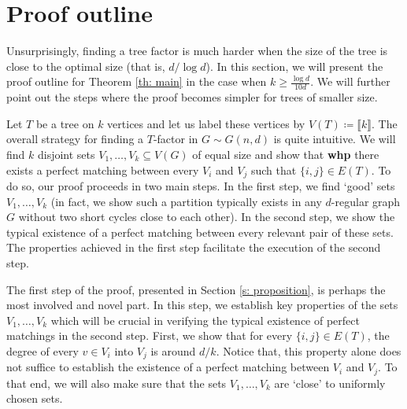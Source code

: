 \documentclass[notitlepage]{scrartcl}
\newcommand{\br}[1]{\llbracket{#1}\rrbracket}
\begin{document}
 
\section{Proof outline}\label{s: outline}
Unsurprisingly, finding a tree factor is much harder when the size of the tree is close to the optimal size (that is, $d/\log d$). In this section, we will present the proof outline for Theorem \ref{th: main} in the case when $k\geq\frac{\log d}{10d}$. We will further point out the steps where the proof becomes simpler for trees of smaller size.

Let $T$ be a tree on $k$ vertices and let us label these vertices by $V(T) \coloneqq \br{k}$. The overall strategy for finding a $T$-factor in $G \sim G(n, d)$ is quite intuitive. We will find $k$ disjoint sets $V_1, \dots, V_k \subseteq V(G)$ of equal size and show that \textbf{whp} there exists a perfect matching between every $V_i$ and $V_j$ such that $\{i,j\} \in E(T)$. To do so, our proof proceeds in two main steps. In the first step, we find `good' sets $V_1, \dots, V_k$ (in fact, we show such a partition typically exists in any $d$-regular graph $G$ without two short cycles close to each other). In the second step, we show the typical existence of a perfect matching between every relevant pair of these sets. The properties achieved in the first step facilitate the execution of the second step.

The first step of the proof, presented in Section \ref{s: proposition}, is perhaps the most involved and novel part. In this step, we establish key properties of the sets $V_1,\ldots, V_k$ which will be crucial in verifying the typical existence of perfect matchings in the second step. First, we show that for every $\{i,j\}\in E(T)$, the degree of every $v \in V_i$ into $V_j$ is around $d/k$. Notice that, this property alone does not suffice to establish the existence of a perfect matching between $V_i$ and $V_j$. To that end, we will also make sure that the sets $V_1, \dots, V_k$ are `close' to uniformly chosen sets. %
\end{document}
